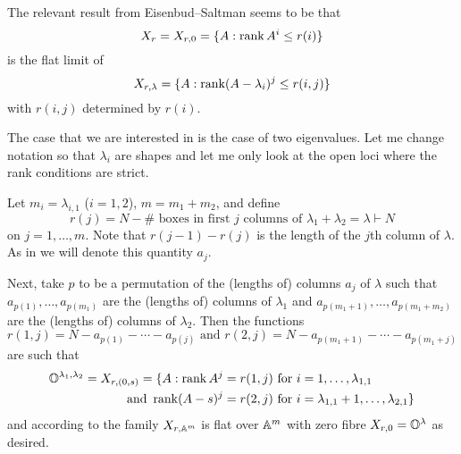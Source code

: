 \documentclass[draft]{article}
\begin{document}
\begin{itemize}
\begin{remark}

The relevant result from Eisenbud--Saltman seems to be that 
$$X_r = X_{r,0} = \{A:\rk A^i \le r(i) \}$$ 
is the flat limit of 
$$X_{r,\lambda} = \{A : \rk (A-\lambda_i)^j\le r(i,j)\}$$
with $r(i,j)$ determined by $r(i)$.  

The case that we are interested in is the case of two eigenvalues. Let me change notation so that $\lambda_i$ are shapes and let me only look at the open loci where the rank conditions are strict. 

Let $m_i = \lambda_{i,1}$ ($i = 1,2$), $m = m_1 + m_2$, and define
$$r(j) = N - \#\text{~boxes in first $j$ columns of }\lambda_1 + \lambda_2 = \lambda\vdash N$$
on $j = 1,\dots,m$. Note that $r(j-1) - r(j)$ is the length of the $j$th column of $\lambda$. As in \cite{eisenbud1989rank} we will denote this quantity $a_j$. 
% 

Next, take $p$ to be a permutation of the (lengths of) columns $a_j$ of $\lambda$ such that $a_{p(1)},\dots,a_{p(m_1)}$ are the (lengths of) columns of $\lambda_1$ and $a_{p(m_1 + 1)},\dots, a_{p(m_1 + m_2)}$ are the (lengths of) columns of $\lambda_2$. 
Then the functions 
$$
r(1,j) = N - a_{p(1)} - \cdots - a_{p(j)} \text{ and } r(2,j) = N - a_{p(m_1 + 1)} - \cdots - a_{p(m_1 + j)}
$$
are such that 
\begin{align*}
    \OO^{\lambda_1,\lambda_2} = X_{r,(0,s)} = \{A:\rk A^j &= r(1,j) \text{ for } i = 1,\dots,\lambda_{1,1} \\ \text{ and } \rk (A-s)^j &= r(2,j) \text{ for } i = \lambda_{1,1} + 1 ,\dots, \lambda_{2,1} \}
\end{align*}
and according to \cite[Theorem 2.1(iii)]{eisenbud1989rank} the family $X_{r,\AA^m}$ is flat over $\AA^m$ with zero fibre $X_{r,0} = \OO^\lambda$ as desired.
 



\end{remark}
\end{itemize}
\end{document}
